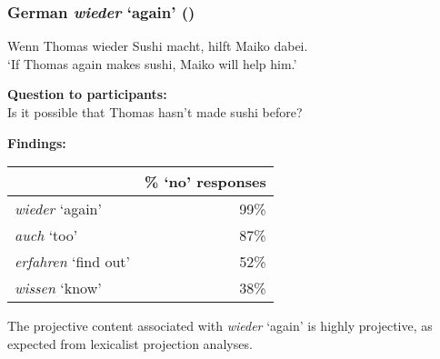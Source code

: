 \documentclass[pdf,xcolor=table,envcountsect,handout]{beamer}
\begin{document}
\begin{frame}
\frametitle{German {\em wieder} `again' (\citealt{xue-onea11})}

\pause

\begin{exe}
 Wenn Thomas wieder Sushi macht, hilft Maiko dabei.
\\ `If Thomas again makes sushi, Maiko will help him.'
\end{exe}

{\bf Question to participants:} \\[-.1cm] \hspace*{1cm} Is it possible that Thomas hasn't made sushi before?

\bigskip
\pause

{\bf Findings:} \hspace*{1cm} \begin{tabular}[t]{lr}
	& \% `no' responses \\\hline
	\pause
{\em wieder} `again' & 99\%  \\
\pause
{\em auch} `too' & 87\% \\ 
{\em erfahren} `find out' & 52\% \\
{\em wissen} `know' & 38\%
\end{tabular}

\bigskip

The projective content associated with {\em wieder} `again' is highly projective, as expected from lexicalist projection analyses.

\end{frame}


%
%
%
%
%
%
%
%
\end{document}
